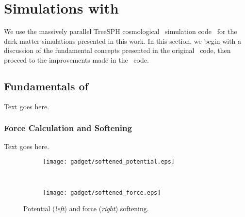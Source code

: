 
%
%

\section{Simulations with \gadgettwo}
\label{sec:gadget}



We use the massively parallel TreeSPH cosmological \nbody\ simulation code \gadgettwo\ for the dark matter simulations presented in this work.  In this section, we begin with a discussion of the fundamental concepts presented in the original \gadget\ code, then proceed to the improvements made in the \gadgettwo\ code.




\subsection{Fundamentals of \gadget}
\label{subsec:gadget--gadget}


Text goes here.



\subsubsection{Force Calculation and Softening}
\label{subsubsec:gadget--gadget--softening}


Text goes here.

\begin{figure}[t]
	\centering
	\begin{subfigure}{}
		\texttt{[image: gadget/softened\_potential.eps]}
	\end{subfigure}
	~
	\begin{subfigure}{}
		\texttt{[image: gadget/softened\_force.eps]}
	\end{subfigure}
	\caption[Potential and force softening.]{Potential (\emph{left}) and force (\emph{right}) softening.}
	\label{fig:gadget--softening}
\end{figure}



